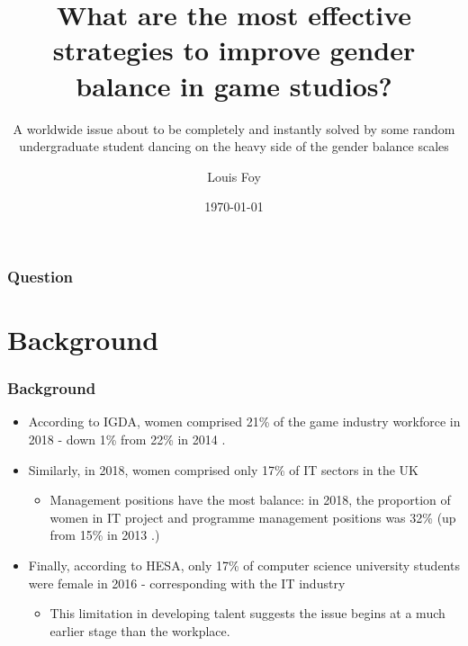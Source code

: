 \documentclass{beamer}
\title{What are the most effective strategies to improve gender balance in game studios?}
\subtitle{A worldwide issue about to be completely and instantly solved by some random undergraduate student dancing on the heavy side of the gender balance scales}
\author{Louis Foy}
\institute{Falmouth University}
\date{\today}
\begin{document}
\begin{frame}
	\titlepage
\end{frame}

\begin{frame}
	\frametitle{Question}
	\tableofcontents
\end{frame}

\section{Background}
\begin{frame}
	\frametitle{Background}
	\begin{itemize}
	    \item According to IGDA, women comprised 21\% of the game industry workforce in 2018 \cite{igda_satisfaction_2017} - down 1\% from 22\% in 2014 \cite{igda_satisfaction_2014}.
	    \item Similarly, in 2018, women comprised only 17\% of IT sectors in the UK \cite{uk_employees_2018} %
	    \begin{itemize}
	        \item Management positions have the most balance: in 2018, the proportion of women in IT project and programme management positions was 32\% \cite{uk_employees_2018} (up from 15\% in 2013 \cite{uk_employees_2013}.)
	    \end{itemize}
	    \item Finally, according to HESA, only 17\% of computer science university students were female in 2016 \cite{hesa_2016} - corresponding with the IT industry
	    \begin{itemize}
	        \item This limitation in developing talent suggests the issue begins at a much earlier stage than the workplace.
	    \end{itemize}
	\end{itemize}
\end{frame}
\end{document}
